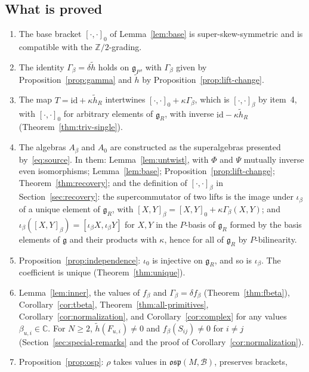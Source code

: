 \documentclass[11pt]{article}
\numberwithin{equation}{section}
\theoremstyle{definition}
\theoremstyle{remark}
\newcommand{\osp}{\mathfrak{osp}}
\begin{document}
\subsection{What is proved}\label{subsec:formal-proved}

\begin{enumerate}
\item The base bracket $[\cdot,\cdot]_0$ of Lemma~\ref{lem:base} is super-skew-symmetric and
is compatible with the $\mathbb Z/2$-grading.
\item The identity $\Gamma_\beta=\delta\tilde h$ holds on $\mathfrak g_P$, with $\Gamma_\beta$ given by
Proposition~\ref{prop:gamma} and $\tilde h$ by Proposition~\ref{prop:lift-change}.
\item The map $T=\mathrm{id}+\kappa\tilde h_R$ intertwines $[\cdot,\cdot]_0+\kappa\Gamma_\beta$, which is
$[\cdot,\cdot]_\beta$ by item~4, with $[\cdot,\cdot]_0$ for arbitrary elements of $\mathfrak g_R$, with inverse $\mathrm{id}-\kappa\tilde h_R$
(Theorem~\ref{thm:triv-single}).
\item The algebras $A_\beta$ and $A_0$ are constructed as the superalgebras presented
by~\eqref{eq:source}. In them: Lemma~\ref{lem:untwist}, with $\Phi$ and $\Psi$ mutually inverse
even isomorphisms; Lemma~\ref{lem:base}; Proposition~\ref{prop:lift-change};
Theorem~\ref{thm:recovery}; and the definition of $[\cdot,\cdot]_\beta$ in
Section~\ref{sec:recovery}: the supercommutator of two lifts is the image under $\iota_\beta$ of a
unique element of $\mathfrak g_R$, with $[X,Y]_\beta=[X,Y]_0+\kappa\Gamma_\beta(X,Y)$; and
$\iota_\beta([X,Y]_\beta)=[\iota_\beta X,\iota_\beta Y]$ for $X,Y$ in the $P$-basis of $\mathfrak g_R$ formed
by the basis elements of $\mathfrak g$ and their products with $\kappa$, hence for all of $\mathfrak g_R$
by $P$-bilinearity.
\item Proposition~\ref{prop:independence}: $\iota_0$ is injective on $\mathfrak g_R$, and so is
$\iota_\beta$. The coefficient is unique (Theorem~\ref{thm:unique}).
\item Lemma~\ref{lem:inner}, the values of $f_\beta$ and $\Gamma_\beta=\delta f_\beta$
(Theorem~\ref{thm:fbeta}), Corollary~\ref{cor:tbeta}, Theorem~\ref{thm:all-primitives},
Corollary~\ref{cor:normalization}, and Corollary~\ref{cor:complex} for any values
$\beta_{u,i}\in\mathbb C$. For $N\geq2$, $\tilde h(F_{u,i})\neq0$ and $f_\beta(S_{ij})\neq0$ for
$i\neq j$ (Section~\ref{sec:special-remarks} and the proof of Corollary~\ref{cor:normalization}).
\item Proposition~\ref{prop:osp}: $\rho$ takes values in $\osp(M,\mathcal B)$, preserves brackets,

\end{enumerate}
\end{document}
